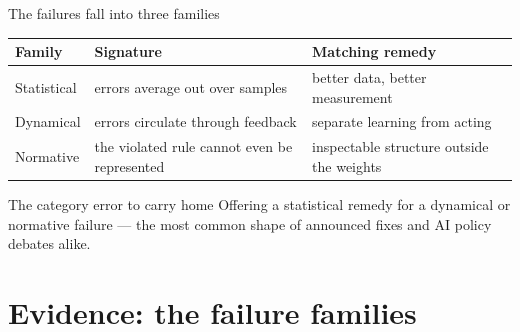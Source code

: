 \documentclass[11pt]{beamer}
\begin{document}
\begin{frame}{The failures fall into three families}
  \begin{table}
    \centering\footnotesize
    \begin{tabular}{@{}p{}p{}p{}@{}}
      \toprule
      \textbf{Family} & \textbf{Signature} & \textbf{Matching remedy} \\
      \midrule
      Statistical & errors average out over samples & better data, better measurement \\
      Dynamical   & errors circulate through feedback & separate learning from acting \\
      Normative   & the violated rule cannot even be represented & inspectable structure outside the weights \\
      \bottomrule
    \end{tabular}
  \end{table}
  \begin{alertblock}{The category error to carry home}
    Offering a statistical remedy for a dynamical or normative failure ---
    the most common shape of announced fixes and AI policy debates alike.
  \end{alertblock}
\end{frame}

\section{Evidence: the failure families}
\end{document}
